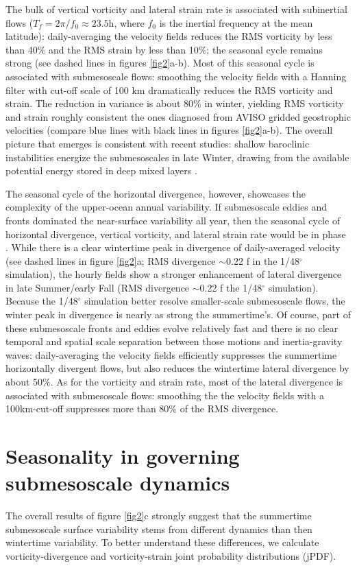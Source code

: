\documentclass[grl]{agutex2015}
\begin{document}
\begin{article}
The bulk of vertical vorticity and lateral strain rate is associated with subinertial flows
($T_f = 2\pi/f_0\approx 23.5$h, where $f_0$ is the inertial frequency at
the mean latitude): daily-averaging the velocity fields reduces the RMS
vorticity by less than 40$\%$ and the RMS strain by less than 10$\%$; the seasonal
cycle remains strong (see
dashed lines in figures \ref{fig2}a-b). Most of this seasonal cycle is associated
with submesoscale flows: smoothing the velocity fields
with a Hanning filter with cut-off scale of 100 km dramatically reduces the RMS
vorticity and strain. The reduction in variance is about 80$\%$ in winter,
yielding RMS vorticity and strain roughly consistent the ones diagnosed from
AVISO gridded geostrophic velocities (compare blue lines with black lines in figures \ref{fig2}a-b).
The overall picture that emerges is consistent with recent studies: shallow baroclinic
instabilities energize the submesoscales in late Winter, drawing from the available
potential energy stored in deep mixed layers \citep{sasaki_etal2014,callies_etal2015,callies_etal2016}.

The seasonal cycle of the horizontal divergence, however, showcases the complexity
of the upper-ocean annual variability. If submesoscale eddies and fronts dominated
the near-surface variability all year, then the seasonal cycle of horizontal divergence,
vertical vorticity, and lateral strain rate would be in phase \citep[e.g.,][]{sasaki_etal2014}.
While there is a clear wintertime peak in divergence of daily-averaged velocity
(see dashed lines in figure \ref{fig2}a; RMS divergence $\sim$0.22 f in the 1/48$^\circ$
simulation), the hourly fields show
a stronger enhancement of
lateral divergence in late Summer/early Fall (RMS divergence $\sim$0.22 f the 1/48$^\circ$
simulation). Because the 1/48$^\circ$ simulation better resolve
smaller-scale submesoscale flows, the
winter peak in divergence is nearly as strong the summertime's. Of course, part of
these submesoscale fronts and eddies evolve relatively fast and there is no clear
temporal and spatial scale separation between those motions and inertia-gravity waves:
daily-averaging the velocity fields efficiently suppresses the summertime horizontally
divergent flows, but also reduces the wintertime lateral divergence by about 50$\%$.
As for the vorticity and strain rate, most of the lateral divergence is associated
with submesoscale flows: smoothing the the velocity fields with a 100km-cut-off
suppresses more than 80$\%$ of the RMS divergence.

\section{Seasonality in governing submesoscale dynamics}
The overall results of figure \ref{fig2}c strongly suggest that the
summertime submesoscale surface variability stems from different dynamics than
then wintertime variability. To better understand these differences, we calculate
vorticity-divergence and vorticity-strain joint probability distributions (jPDF).



\end{article}
\end{document}

